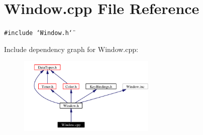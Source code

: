 \section{Window.cpp File Reference}
\label{Window_8cpp}
{\tt \#include \char`\"{}Window.h\char`\"{}}\par


Include dependency graph for Window.cpp:\begin{figure}[H]
\begin{center}
\leavevmode
\includegraphics[width=185pt]{Window_8cpp__incl}
\end{center}
\end{figure}
